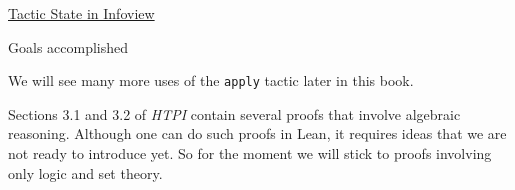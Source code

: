 \documentclass[
  letterpaper,
  DIV=11,
  numbers=noendperiod]{scrreprt}
\newenvironment{Shaded}{\begin{snugshade}}{\end{snugshade}}
\newcommand{\NormalTok}[1]{\textcolor[rgb]{0.00,0.23,0.31}{#1}}
\newcommand{\SpecialCharTok}[1]{\textcolor[rgb]{0.37,0.37,0.37}{#1}}
\renewcommand{\NormalTok}[1]{\textcolor[HTML]{000000}{#1}}
\renewcommand{\SpecialCharTok}[1]{}
\newcommand{\nobreakShaded}{\renewenvironment{Shaded}
	{\begin{tcolorbox}[frame hidden, enhanced, interior hidden, boxrule=0pt,
		borderline west={3pt}{0pt}{shadecolor}, sharp corners]}
	{\end{tcolorbox}}}
\newenvironment{outpt}
	{\nobreakShaded\begin{minipage}[t]{0.32\textwidth}
		\uline{Tactic State in Infoview}}
	{\end{minipage}}
\theoremstyle{remark}
\begin{document}
\begin{outpt}

\begin{Shaded}
\begin{Highlighting}[]
\SpecialCharTok{!!}\NormalTok{Goals accomplished 🎉}
\end{Highlighting}
\end{Shaded}

\end{outpt}

We will see many more uses of the \texttt{apply} tactic later in this
book.

Sections 3.1 and 3.2 of \emph{HTPI} contain several proofs that involve
algebraic reasoning. Although one can do such proofs in Lean, it
requires ideas that we are not ready to introduce yet. So for the moment
we will stick to proofs involving only logic and set theory.
\end{document}
